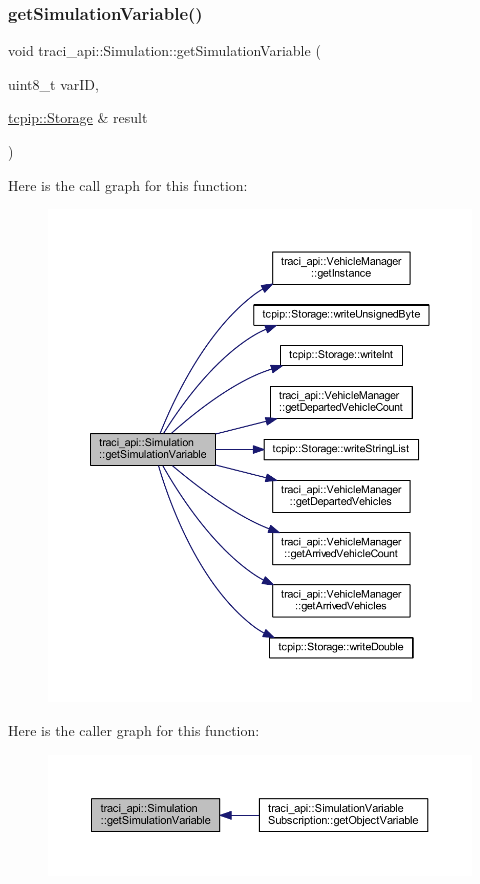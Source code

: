 \subsubsection{\texorpdfstring{get\+Simulation\+Variable()}{getSimulationVariable()}}
{\footnotesize\ttfamily void traci\+\_\+api\+::\+Simulation\+::get\+Simulation\+Variable (\begin{DoxyParamCaption}\item[{uint8\+\_\+t}]{var\+ID,  }\item[{\hyperlink{classtcpip_1_1_storage}{tcpip\+::\+Storage} \&}]{result }\end{DoxyParamCaption})}

Here is the call graph for this function\+:
\nopagebreak
\begin{figure}[H]
\begin{center}
\leavevmode
\includegraphics[width=350pt]{classtraci__api_1_1_simulation_aa7ebe041dd0f34ccef7f2f2293775c3b_cgraph}
\end{center}
\end{figure}
Here is the caller graph for this function\+:
\nopagebreak
\begin{figure}[H]
\begin{center}
\leavevmode
\includegraphics[width=350pt]{classtraci__api_1_1_simulation_aa7ebe041dd0f34ccef7f2f2293775c3b_icgraph}
\end{center}
\end{figure}
